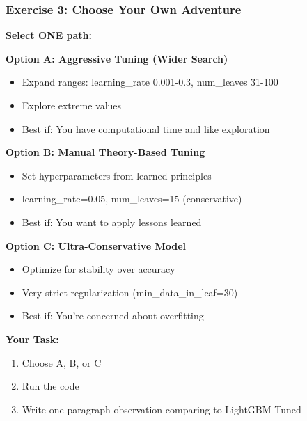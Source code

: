 \documentclass{beamer}
\begin{document}
\begin{frame}[fragile]
\frametitle{Exercise 3: Choose Your Own Adventure}

\textbf{Select ONE path:}

\vspace{0.2cm}
\textbf{Option A: Aggressive Tuning (Wider Search)}
\begin{itemize}
    \item Expand ranges: learning\_rate 0.001-0.3, num\_leaves 31-100
    \item Explore extreme values
    \item Best if: You have computational time and like exploration
\end{itemize}

\vspace{0.2cm}
\textbf{Option B: Manual Theory-Based Tuning}
\begin{itemize}
    \item Set hyperparameters from learned principles
    \item learning\_rate=0.05, num\_leaves=15 (conservative)
    \item Best if: You want to apply lessons learned
\end{itemize}

\vspace{0.2cm}
\textbf{Option C: Ultra-Conservative Model}
\begin{itemize}
    \item Optimize for stability over accuracy
    \item Very strict regularization (min\_data\_in\_leaf=30)
    \item Best if: You're concerned about overfitting
\end{itemize}

\vspace{0.3cm}
\textbf{Your Task:}

\begin{enumerate}
    \item Choose A, B, or C
    \item Run the code
    \item Write one paragraph observation comparing to LightGBM Tuned
\end{enumerate}

\end{frame}
\end{document}

